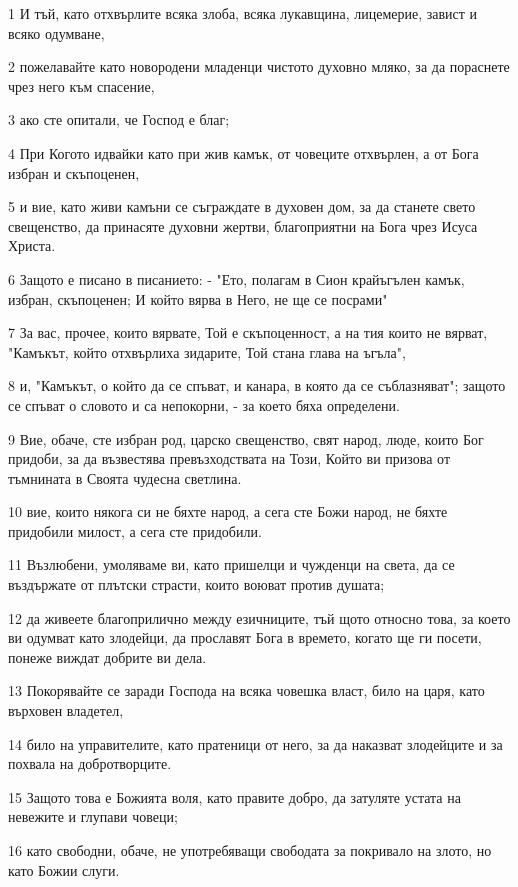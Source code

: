 \par 1 И тъй, като отхвърлите всяка злоба, всяка лукавщина, лицемерие, завист и всяко одумване,
\par 2 пожелавайте като новородени младенци чистото духовно мляко, за да пораснете чрез него към спасение,
\par 3 ако сте опитали, че Господ е благ;
\par 4 При Когото идвайки като при жив камък, от човеците отхвърлен, а от Бога избран и скъпоценен,
\par 5 и вие, като живи камъни се съграждате в духовен дом, за да станете свето свещенство, да принасяте духовни жертви, благоприятни на Бога чрез Исуса Христа.
\par 6 Защото е писано в писанието: - "Ето, полагам в Сион крайъгълен камък, избран, скъпоценен; И който вярва в Него, не ще се посрами"
\par 7 За вас, прочее, които вярвате, Той е скъпоценност, а на тия които не вярват, "Камъкът, който отхвърлиха зидарите, Той стана глава на ъгъла",
\par 8 и, "Камъкът, о който да се спъват, и канара, в която да се съблазняват"; защото се спъват о словото и са непокорни, - за което бяха определени.
\par 9 Вие, обаче, сте избран род, царско свещенство, свят народ, люде, които Бог придоби, за да възвестява превъзходствата на Този, Който ви призова от тъмнината в Своята чудесна светлина.
\par 10 вие, които някога си не бяхте народ, а сега сте Божи народ, не бяхте придобили милост, а сега сте придобили.
\par 11 Възлюбени, умоляваме ви, като пришелци и чужденци на света, да се въздържате от плътски страсти, които воюват против душата;
\par 12 да живеете благоприлично между езичниците, тъй щото относно това, за което ви одумват като злодейци, да прославят Бога в времето, когато ще ги посети, понеже виждат добрите ви дела.
\par 13 Покорявайте се заради Господа на всяка човешка власт, било на царя, като върховен владетел,
\par 14 било на управителите, като пратеници от него, за да наказват злодейците и за похвала на добротворците.
\par 15 Защото това е Божията воля, като правите добро, да затуляте устата на невежите и глупави човеци;
\par 16 като свободни, обаче, не употребяващи свободата за покривало на злото, но като Божии слуги.

